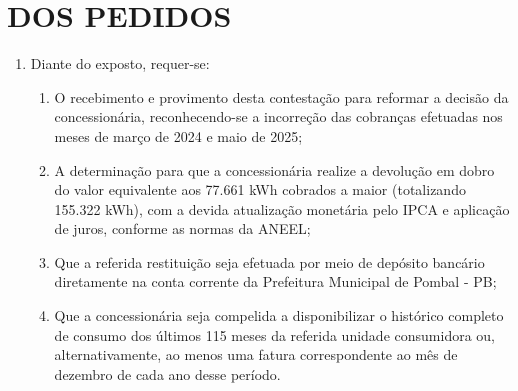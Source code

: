 \section{DOS PEDIDOS}

\begin{enumerate}[resume]
\item Diante do exposto, requer-se:
    \begin{enumerate}
    \item O recebimento e provimento desta contestação para reformar a decisão da concessionária, reconhecendo-se a incorreção das cobranças efetuadas nos meses de março de 2024 e maio de 2025;
    \item A determinação para que a concessionária realize a devolução em dobro do valor equivalente aos 77.661 kWh cobrados a maior (totalizando 155.322 kWh), com a devida atualização monetária pelo IPCA e aplicação de juros, conforme as normas da ANEEL;
    \item Que a referida restituição seja efetuada por meio de depósito bancário diretamente na conta corrente da Prefeitura Municipal de Pombal - PB;
    \item Que a concessionária seja compelida a disponibilizar o histórico completo de consumo dos últimos 115 meses da referida unidade consumidora ou, alternativamente, ao menos uma fatura correspondente ao mês de dezembro de cada ano desse período.
    \end{enumerate}
\end{enumerate}